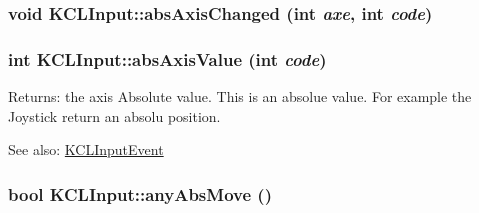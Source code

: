 \hypertarget{class_k_c_l_input_4c1dcd58b3d59b6f2dc059d65b5012e4}{
\subsubsection[{absAxisChanged}]{\setlength{\rightskip}{0pt plus 5cm}void KCLInput::absAxisChanged (int {\em axe}, \/  int {\em code})}}
\label{class_k_c_l_input_4c1dcd58b3d59b6f2dc059d65b5012e4}


\hypertarget{class_k_c_l_input_10f2230a1908c09ffa752052e60a21d9}{
\subsubsection[{absAxisValue}]{\setlength{\rightskip}{0pt plus 5cm}int KCLInput::absAxisValue (int {\em code})}}
\label{class_k_c_l_input_10f2230a1908c09ffa752052e60a21d9}


\begin{Desc}
\item[Returns:]the axis Absolute value. This is an absolue value. For example the Joystick return an absolu position. \end{Desc}
\begin{Desc}
\item[See also:]\hyperlink{class_k_c_l_input_event}{KCLInputEvent} \end{Desc}
\hypertarget{class_k_c_l_input_addbe22e22824c19e38deedfb603ee6c}{
\subsubsection[{anyAbsMove}]{\setlength{\rightskip}{0pt plus 5cm}bool KCLInput::anyAbsMove ()}}
\label{class_k_c_l_input_addbe22e22824c19e38deedfb603ee6c}


